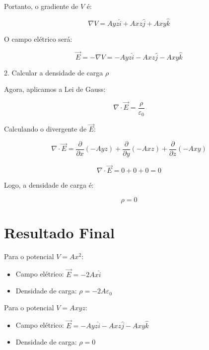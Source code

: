 \documentclass[a4paper,12pt]{article}
\begin{document}
\begin{flushleft}
Portanto, o gradiente de \( V \) é:

\begin{equation}
\nabla V = A y z \hat{i} + A x z \hat{j} + A x y \hat{k}
\end{equation}

O campo elétrico será:

\begin{equation}
\vec{E} = -\nabla V = - A y z \hat{i} - A x z \hat{j} - A x y \hat{k}
\end{equation}

2. Calcular a densidade de carga \( \rho \)

Agora, aplicamos a Lei de Gauss:

\begin{equation}
\nabla \cdot \vec{E} = \frac{\rho}{\varepsilon_0}
\end{equation}

Calculando o divergente de \( \vec{E} \):

\begin{equation}
\nabla \cdot \vec{E} = \frac{\partial}{\partial x} (- A y z) + \frac{\partial}{\partial y} (- A x z) + \frac{\partial}{\partial z} (- A x y)
\end{equation}

\begin{equation}
\nabla \cdot \vec{E} = 0 + 0 + 0 = 0
\end{equation}

Logo, a densidade de carga é:

\begin{equation}
\rho = 0
\end{equation}

\section*{Resultado Final}

Para o potencial \( V = A x^2 \):
\begin{itemize}
\item Campo elétrico: \( \vec{E} = - 2 A x \hat{i} \)
\item Densidade de carga: \( \rho = - 2 A \varepsilon_0 \)
\end{itemize}

Para o potencial \( V = A x y z \):

\begin{itemize}
\item Campo elétrico: \( \vec{E} = - A y z \hat{i} - A x z \hat{j} - A x y \hat{k} \)
\item Densidade de carga: \( \rho = 0 \)
\end{itemize}

\end{flushleft}
\end{document}
